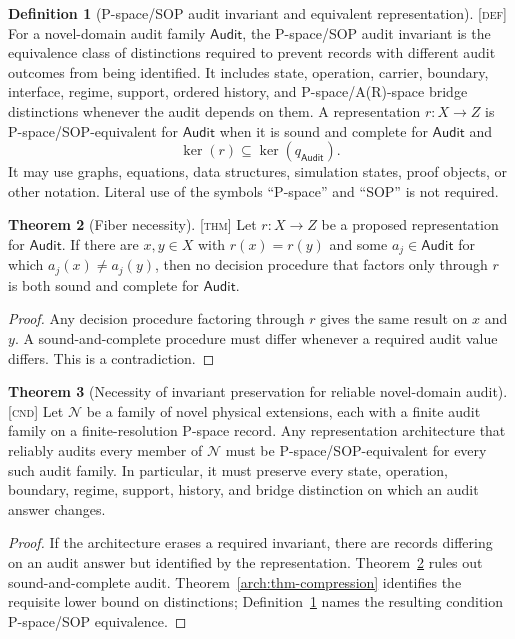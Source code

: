 \documentclass[11pt]{article}
\newcommand{\Audit}{\ensuremath{\mathsf{Audit}}}
\newcommand{\Defn}{\textsc{[def]}}
\newcommand{\Thm}{\textsc{[thm]}}
\newcommand{\Cnd}{\textsc{[cnd]}}
\theoremstyle{definition}
\newtheorem{sdefinition}{Definition}
\newtheorem{stheorem}[sdefinition]{Theorem}
\begin{document}
\begin{sdefinition}[P-space/SOP audit invariant and equivalent representation]
\label{arch:def-equivalence}
\Defn{} For a novel-domain audit family $\Audit$, the P-space/SOP audit invariant is
the equivalence class of distinctions required to prevent records with different
audit outcomes from being identified. It includes state, operation, carrier,
boundary, interface, regime, support, ordered history, and P-space/A(R)-space
bridge distinctions whenever the audit depends on them. A representation
$r:X\to Z$ is P-space/SOP-equivalent for $\Audit$ when it is sound and complete
for $\Audit$ and
\begin{equation}
\ker(r)\subseteq\ker(q_{\Audit}).
\label{arch:eq-equivalence}
\end{equation}
It may use graphs, equations, data structures, simulation states, proof objects, or
other notation. Literal use of the symbols ``P-space'' and ``SOP'' is not required.
\end{sdefinition}

\begin{stheorem}[Fiber necessity]
\label{arch:thm-fiber}
\Thm{} Let $r:X\to Z$ be a proposed representation for $\Audit$. If there are
$x,y\in X$ with $r(x)=r(y)$ and some $a_j\in\Audit$ for which $a_j(x)\neq a_j(y)$,
then no decision procedure that factors only through $r$ is both sound and complete
for $\Audit$.
\end{stheorem}

\begin{proof}
Any decision procedure factoring through $r$ gives the same result on $x$ and $y$.
A sound-and-complete procedure must differ whenever a required audit value differs.
This is a contradiction.
\end{proof}

\begin{stheorem}[Necessity of invariant preservation for reliable novel-domain audit]
\label{arch:thm-necessity}
\Cnd{} Let $\mathcal N$ be a family of novel physical extensions, each with a
finite audit family on a finite-resolution P-space record. Any representation
architecture that reliably audits every member of $\mathcal N$ must be
P-space/SOP-equivalent for every such audit family. In particular, it must preserve
every state, operation, boundary, regime, support, history, and bridge distinction
on which an audit answer changes.
\end{stheorem}

\begin{proof}
If the architecture erases a required invariant, there are records differing on an
audit answer but identified by the representation. Theorem~\ref{arch:thm-fiber}
rules out sound-and-complete audit. Theorem~\ref{arch:thm-compression} identifies
the requisite lower bound on distinctions; Definition~\ref{arch:def-equivalence}
names the resulting condition P-space/SOP equivalence.
\end{proof}
\end{document}
